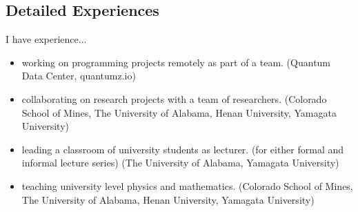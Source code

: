 \documentclass[fontsize=12pt]{article}
\begin{document}
\subsection*{Detailed Experiences}

I have experience...
%
\begin{itemize}
  \item working on programming projects remotely as part of a team. (Quantum Data Center, quantumz.io)
  \item collaborating on research projects with a team of researchers. (Colorado School of Mines, The University of Alabama, Henan University, Yamagata University)
  \item leading a classroom of university students as lecturer. (for either formal and informal lecture series) (The University of Alabama, Yamagata University)
  \item teaching university level physics and mathematics. (Colorado School of Mines, The University of Alabama, Henan University, Yamagata University)
\end{itemize}
\end{document}
